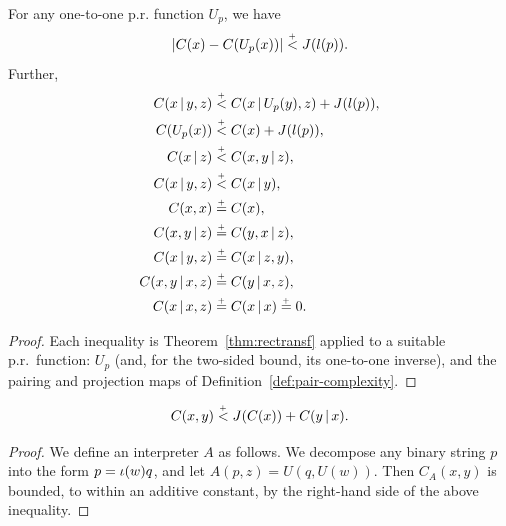 \begin{corollary}
  \leanok
   \label{c:upbdrec}
 For any one-to-one p.r. function \( U_{p} \), we have 
 \[ |C(x) - C(U_{p}(x))| \stackrel{{}_+}{<} J(l(p)).
 \]
  Further,
 \begin{align} 	C(x \,\vert\, y,z)	&\stackrel{{}_+}{<}  C(x \,\vert\, U_{p}(y),z)+J(l(p)), \nonumber
  \\	C(U_{p}(x)) 	&\stackrel{{}_+}{<}  C(x) + J(l(p)),\nonumber	
  \\	C(x \,\vert\, z)	&\stackrel{{}_+}{<}  C(x,y \,\vert\, z), \label{eq:x.xy} 		
  \\	C(x \,\vert\, y,z)	&\stackrel{{}_+}{<}  C(x \,\vert\, y),   \nonumber		
  \\	C(x,x)		&\stackrel{{}_+}{=}  C(x),       \label{eq:xx.x}
  \\	C(x,y \,\vert\, z)	&\stackrel{{}_+}{=}  C(y,x \,\vert\, z),	\nonumber	
  \\	C(x \,\vert\, y,z)	&\stackrel{{}_+}{=}  C(x \,\vert\, z,y),	\nonumber	
  \\	C(x,y \,\vert\, x,z)	&\stackrel{{}_+}{=}  C(y \,\vert\, x,z),	\nonumber	
  \\	C(x \,\vert\, x,z)	&\stackrel{{}_+}{=}  C(x \,\vert\, x) \stackrel{{}_+}{=} 0.  \nonumber		
 \end{align}
 \end{corollary}
\begin{proof}
  \leanok
  Each inequality is Theorem~\ref{thm:rectransf} applied to a suitable p.r.\ function: $U_p$ (and, for the two-sided bound, its one-to-one inverse), and the pairing and projection maps of Definition~\ref{def:pair-complexity}.
\end{proof}


 \begin{theorem}
  \leanok
   \label{thm:addit}
 \[  C(x,y) \stackrel{{}_+}{<} J(C(x)) + C(y \,\vert\, x).
 \]
 \end{theorem}

\begin{proof}
  \leanok
 We define an interpreter \( A \) as follows. 
We decompose any binary
string \( p \) into the form \( p = \iota(w)q \), and let \( A(p,z) = U(q,U(w)) \).
Then \( C_A(x,y) \) is bounded, to within an additive constant, by the 
right-hand side of the above inequality.
 \end{proof}

